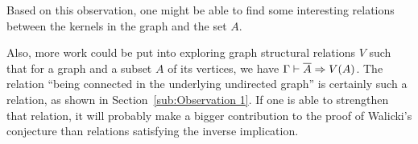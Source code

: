 Based on this observation, one might be able to find some interesting relations between the kernels in the graph and the set $A$.

Also, more work could be put into exploring graph structural relations $V$ such that for a graph and a subset $A$ of its vertices, we have $\Gamma \vdash \ol{A} \Rightarrow V(A)$.
The relation ``being connected in the underlying undirected graph'' is certainly such a relation, as shown in Section~\ref{sub:Observation 1}.
If one is able to strengthen that relation, it will probably make a bigger contribution to the proof of Walicki's conjecture than relations satisfying the inverse implication.
